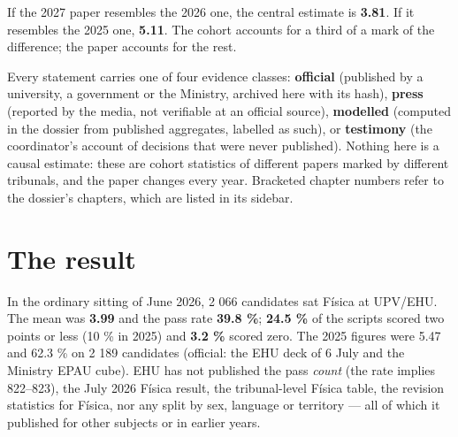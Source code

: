 \documentclass[
  10.5pt,
  a4paper,
  DIV=11,
  numbers=noendperiod]{scrartcl}
\begin{document}
\begin{tcolorbox}
If the 2027 paper resembles the 2026 one, the central estimate is
\textbf{3.81}. If it resembles the 2025 one, \textbf{5.11}. The cohort
accounts for a third of a mark of the difference; the paper accounts for
the rest.

\end{tcolorbox}

\begin{tcolorbox}[enhanced jigsaw, arc=.35mm, bottomrule=.15mm, bottomtitle=1mm, breakable, colback=white, colbacktitle=quarto-callout-note-color!10!white, colframe=quarto-callout-note-color-frame, coltitle=black, left=2mm, leftrule=.75mm, opacityback=0, opacitybacktitle=0.6, rightrule=.15mm, title=\textcolor{quarto-callout-note-color}{\faInfo}\hspace{0.5em}{How to read this document}, titlerule=0mm, toprule=.15mm, toptitle=1mm]

Every statement carries one of four evidence classes: \textbf{official}
(published by a university, a government or the Ministry, archived here
with its hash), \textbf{press} (reported by the media, not verifiable at
an official source), \textbf{modelled} (computed in the dossier from
published aggregates, labelled as such), or \textbf{testimony} (the
coordinator's account of decisions that were never published). Nothing
here is a causal estimate: these are cohort statistics of different
papers marked by different tribunals, and the paper changes every year.
Bracketed chapter numbers refer to the dossier's chapters, which are
listed in its sidebar.

\end{tcolorbox}

\section{The result}\label{the-result}

In the ordinary sitting of June 2026, 2 066 candidates sat Física at
UPV/EHU. The mean was \textbf{3.99} and the pass rate \textbf{39.8 \%};
\textbf{24.5 \%} of the scripts scored two points or less (10 \% in
2025) and \textbf{3.2 \%} scored zero. The 2025 figures were 5.47 and
62.3 \% on 2 189 candidates (official: the EHU deck of 6 July and the
Ministry EPAU cube). EHU has not published the pass \emph{count} (the
rate implies 822--823), the July 2026 Física result, the tribunal-level
Física table, the revision statistics for Física, nor any split by sex,
language or territory --- all of which it published for other subjects
or in earlier years.
\end{document}
